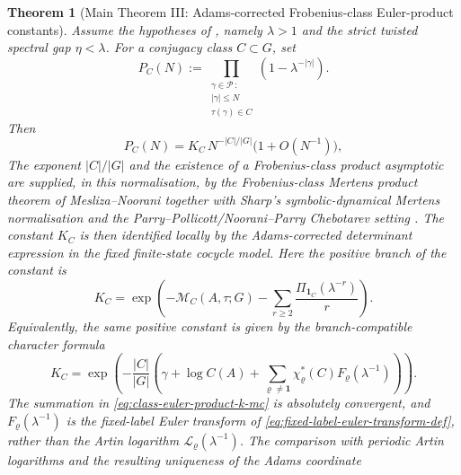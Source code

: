 \documentclass[11pt,a4paper]{amsart}
\theoremstyle{plain}
\newtheorem{theorem}{Theorem}[section]
\theoremstyle{definition}
\theoremstyle{remark}
\newcommand{\cP}{\mathcal P}
\begin{document}
\begin{theorem}[Main Theorem III: Adams-corrected Frobenius-class
  Euler-product constants]
  \label{thm:class-euler-product-mertens}
  Assume the hypotheses of , namely
  \(\lambda>1\) and the strict twisted spectral gap \(\eta<\lambda\). For a
  conjugacy class \(C\subset G\), set
  \begin{equation}\label{eq:class-euler-product-def}
    P_C(N):=
    \prod_{\substack{\gamma\in\cP\,:\\ |\gamma|\le N\\
      \tau(\gamma)\in C}}
      \left(1-\lambda^{-|\gamma|}\right).
  \end{equation}
  Then
  \begin{equation}\label{eq:class-euler-product-asymptotic}
    P_C(N)=K_C\,N^{-|C|/|G|}\bigl(1+O(N^{-1})\bigr),
  \end{equation}
  The exponent \(|C|/|G|\) and the existence of a Frobenius-class product
  asymptotic are supplied, in this normalisation, by the Frobenius-class
  Mertens product theorem of Mesliza--Noorani together with Sharp's
  symbolic-dynamical Mertens normalisation and the Parry--Pollicott/Noorani--Parry
  Chebotarev setting
  \cite{MeslizaNoorani1999FrobeniusMertens,Sharp1991Mertens,ParryPollicott1986Chebotarev,NooraniParry1992ChebotarevShifts}.
  The constant \(K_C\) is then identified locally by the Adams-corrected
  determinant expression in the fixed finite-state cocycle model.
  Here the positive branch of the constant is
  \begin{equation}\label{eq:class-euler-product-k-mc}
    K_C=
    \exp\!\left(
      -\mathcal M_C(A,\tau;G)
      -\sum_{r\ge2}\frac{\Pi_{\mathbf1_C}(\lambda^{-r})}{r}
    \right).
  \end{equation}
  Equivalently, the same positive constant is given by the branch-compatible
  character formula
  \begin{equation}\label{eq:class-euler-product-k-f}
    K_C=
    \exp\!\left(
      -\frac{|C|}{|G|}
      \left(
        \gamma+\log C(A)
        +\sum_{\varrho\neq\mathbf1}
          \chi_\varrho^\ast(C)F_\varrho(\lambda^{-1})
      \right)
    \right).
  \end{equation}
  The summation in \eqref{eq:class-euler-product-k-mc} is absolutely
  convergent, and \(F_\varrho(\lambda^{-1})\) is the fixed-label Euler
  transform of \eqref{eq:fixed-label-euler-transform-def}, rather than the
  Artin logarithm \(\mathcal L_\varrho(\lambda^{-1})\).  The comparison with
  periodic Artin logarithms and the resulting uniqueness of the Adams coordinate

\end{theorem}
\end{document}
